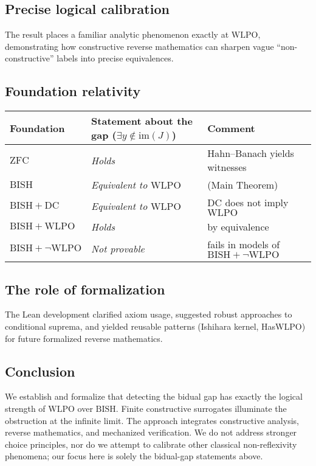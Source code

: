 \documentclass[11pt]{article}
\newcommand{\WLPO}{\mathrm{WLPO}}
\newcommand{\BISH}{\mathrm{BISH}}
\newcommand{\DC}{\mathrm{DC}}
\newcommand{\ZFC}{\mathrm{ZFC}}
\begin{document}
\subsection{Precise logical calibration}

The result places a familiar analytic phenomenon exactly at $\WLPO$, demonstrating how constructive reverse mathematics can sharpen vague ``non-constructive'' labels into precise equivalences.

\subsection{Foundation relativity}

\begin{center}
\small %
\begin{tabular}{lll}
\toprule
Foundation & Statement about the gap ($\exists y\notin \mathrm{im}(J)$) & Comment \\
\midrule
$\ZFC$ & \emph{Holds} & Hahn--Banach yields witnesses \\
$\BISH$ & \emph{Equivalent to $\WLPO$} & (Main Theorem) \\
$\BISH+\DC$ & \emph{Equivalent to $\WLPO$} & $\DC$ does not imply $\WLPO$ \\
$\BISH+\WLPO$ & \emph{Holds} & by equivalence \\
$\BISH+\neg\WLPO$ & \emph{Not provable} & fails in models of $\BISH+\neg\WLPO$ \\
\bottomrule
\end{tabular}
\end{center}

\subsection{The role of formalization}

The Lean development clarified axiom usage, suggested robust approaches to conditional suprema, and yielded reusable patterns (Ishihara kernel, HasWLPO) for future formalized reverse mathematics.

\subsection{Conclusion}

We establish and formalize that detecting the bidual gap has exactly the logical strength of $\WLPO$ over $\BISH$. Finite constructive surrogates illuminate the obstruction at the infinite limit. The approach integrates constructive analysis, reverse mathematics, and mechanized verification. We do not address stronger choice principles, nor do we attempt to calibrate other classical non-reflexivity phenomena; our focus here is solely the bidual-gap statements above.
\end{document}
